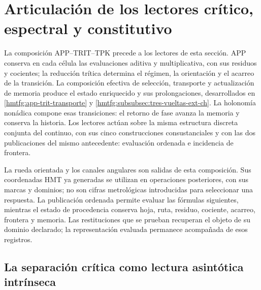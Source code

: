 \section{Articulación de los lectores crítico, espectral y constitutivo}
\label{hmtfg:articulacion:seccion}

La composición APP--TRIT--TPK precede a los lectores de esta sección.
APP conserva en cada célula las evaluaciones aditiva y multiplicativa,
con sus residuos y cocientes; la reducción trítica determina el régimen,
la orientación y el acarreo de la transición. La composición efectiva
de selección, transporte y actualización de memoria produce el estado
enriquecido y sus prolongaciones, desarrollados en
\ref{hmtfg:app-trit-transporte} y
\ref{hmtfg:subsubsec:tres-vueltas-ext-ch}.
La holonomía nonádica compone esas transiciones: el retorno de fase
avanza la memoria y conserva la historia. Los lectores actúan sobre la
misma estructura discreta conjunta del continuo, con sus cinco
construcciones consustanciales y con las dos publicaciones del mismo
antecedente: evaluación ordenada e incidencia de frontera.

La rueda orientada y los canales angulares son salidas de esta
composición. Sus coordenadas HMT ya generadas se utilizan en operaciones
posteriores, con sus marcas y dominios; no son cifras metrológicas
introducidas para seleccionar una respuesta. La publicación ordenada
permite evaluar las fórmulas siguientes, mientras el estado de procedencia
conserva hoja, ruta, residuo, cociente, acarreo, frontera y memoria.
Las restituciones que se prueban recuperan el objeto de su dominio
declarado; la representación evaluada permanece acompañada de esos
registros.

\subsection{La separación crítica como lectura asintótica intrínseca}
\label{hmtfg:articulacion:separacion}

